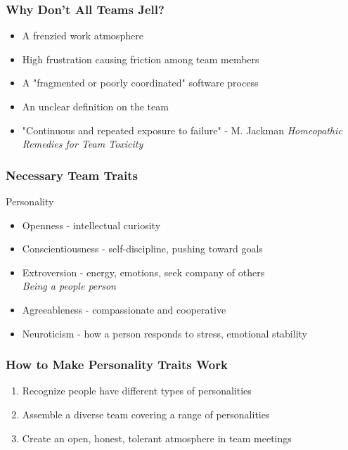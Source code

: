 \documentclass{report}
\begin{document}
				\subsubsection{Why Don't All Teams Jell?}
					\begin{itemize}
						\item A frenzied work atmosphere
						\item High frustration causing friction among team members
						\item A "fragmented or poorly coordinated" software process
						\item An unclear definition on the team
						\item "Continuous and repeated exposure to failure" - M. Jackman \textit{Homeopathic Remedies for Team Toxicity}
					\end{itemize}
				\subsubsection{Necessary Team Traits}
					Personality
					\begin{itemize}
						\item Openness - intellectual curiosity
						\item Conscientiousness - self-discipline, pushing toward goals
						\item Extroversion - energy, emotions, seek company of others\\
							\textit{Being a people person}
						\item Agreeableness - compassionate and cooperative
						\item Neuroticism - how a person responds to stress, emotional stability
					\end{itemize}
				\subsubsection{How to Make Personality Traits Work}
					\begin{enumerate}
						\item Recognize people have different types of personalities
						\item Assemble a diverse team covering a range of personalities
						\item Create an open, honest, tolerant atmosphere in team meetings
					\end{enumerate}
\end{document}
